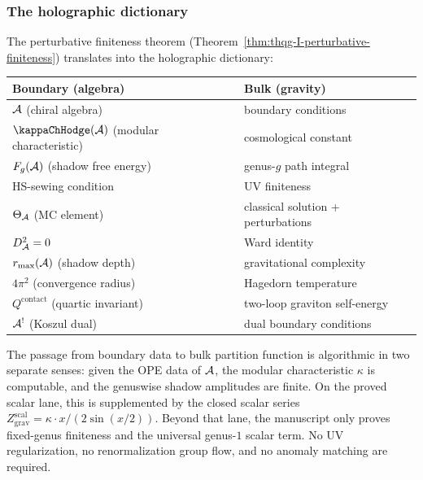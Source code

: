 \subsubsection{The holographic dictionary}

\begin{remark}
The perturbative finiteness theorem (Theorem~\ref{thm:thqg-I-perturbative-finiteness}) translates into the holographic dictionary:
\begin{center}
\renewcommand{\arraystretch}{1.3}
\begin{tabular}{l|l}
\textbf{Boundary (algebra)} & \textbf{Bulk (gravity)} \\
\hline
$\mathcal{A}$ (chiral algebra) & boundary conditions \\
$\kappaChHodge(\cA)$ (modular characteristic) & cosmological constant \\
$F_g(\mathcal{A})$ (shadow free energy) & genus-$g$ path integral \\
HS-sewing condition & UV finiteness \\
$\Theta_{\mathcal{A}}$ (MC element) & classical solution + perturbations \\
$D_{\mathcal{A}}^2 = 0$ & Ward identity \\
$r_{\max}(\mathcal{A})$ (shadow depth) & gravitational complexity \\
$4\pi^2$ (convergence radius) & Hagedorn temperature \\
$Q^{\mathrm{contact}}$ (quartic invariant) & two-loop graviton self-energy \\
$\mathcal{A}^!$ (Koszul dual) & dual boundary conditions \\
\end{tabular}
\end{center}
The passage from boundary data to bulk partition function is
algorithmic in two separate senses: given the OPE data of $\mathcal{A}$, the
modular characteristic $\kappa$ is computable, and the genuswise shadow
amplitudes are finite. On the proved scalar lane, this is supplemented
by the closed scalar series
$Z_{\mathrm{grav}}^{\mathrm{scal}} = \kappa \cdot x/(2\sin(x/2))$.
Beyond that lane, the manuscript only proves fixed-genus finiteness and
the universal genus-$1$ scalar term. No UV regularization, no
renormalization group flow, and no anomaly matching are required.
\end{remark}


